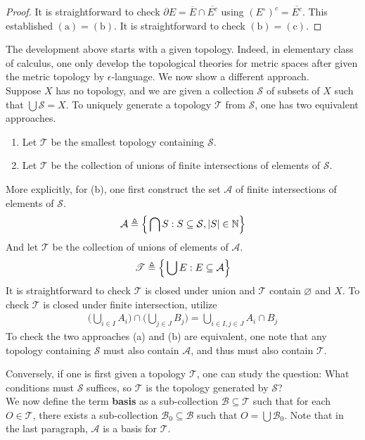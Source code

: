 \documentclass{report}
\begin{document}
\begin{proof}
It is straightforward to check $\partial E=\overline{E}\cap \overline{E^c}$ using $(E^\circ )^c= \overline{E^c}$. This established $(\text{a})=(\text{b})$. It is straightforward to check $(\text{b})=(\text{c})$.
\end{proof}
\begin{mdframed}
The development above starts with a given topology. Indeed, in elementary class of calculus, one only develop the topological theories for metric spaces after given the metric topology by $\epsilon $-language. We now show a different approach.\\

Suppose $X$ has no topology, and we are given a collection $\mathcal{S}$ of subsets of $X$ such that $\bigcup \mathcal{ S}=X$. To uniquely generate a topology $\mathscr{T }$ from $\mathcal{S}$, one has two equivalent approaches. 
\begin{enumerate}[label=(\alph*)]
  \item Let $\mathscr{T }$ be the smallest topology containing $\mathcal{ S}$.
  \item Let $\mathscr{T }$ be the collection of unions of finite intersections of elements of $\mathcal{ S}$.
\end{enumerate}
More explicitly, for (b), one first construct the set $\mathcal{A}$ of finite intersections of elements of $\mathcal{S}$. 
\begin{align*}
\mathcal{A}\triangleq \Big\{ \bigcap S: S \subseteq \mathcal{ S}, \left|S\right|\in\mathbb{N} \Big\}
\end{align*}
And let $\mathscr{T }$ be the collection of unions of elements of $\mathcal{A}$.
\begin{align*}
\mathscr{T }\triangleq \Big\{ \bigcup E:E \subseteq \mathcal{A} \Big\}
\end{align*}
It is straightforward to check $\mathscr{T }$ is closed under union and $\mathscr{T }$ contain $\varnothing$ and $X$. To check $\mathscr{T }$ is closed under finite intersection, utilize 
\begin{align*}
\Big(\bigcup_{i \in I} A_i \Big) \cap \Big(\bigcup_{j\in J} B_j \Big)= \bigcup_{i \in I, j \in J}A_i\cap B_j
\end{align*}
To check the two approaches (a) and (b) are equivalent, one note that any topology containing $\mathcal{ S}$ must also contain $\mathcal{A}$, and thus must also contain $\mathscr{T }$. 
\end{mdframed}
\begin{mdframed}
Conversely, if one is first given a topology $\mathscr{T }$, one can study the question: What conditions must $\mathcal{S}$ suffices, so $\mathscr{T }$ is the topology generated by $\mathcal{ S}$?\\

We now define the term \textbf{basis} as a sub-collection $\mathcal{B}\subseteq \mathscr{T }$ such that for each $O \in \mathscr{T }$, there exists a sub-collection $\mathcal{B}_0\subseteq \mathcal{B}$ such that $O=\bigcup \mathcal{B}_0$. Note that in the last paragraph, $\mathcal{A}$ is a basis for $\mathscr{T }$. 
\end{mdframed}
\end{document}
